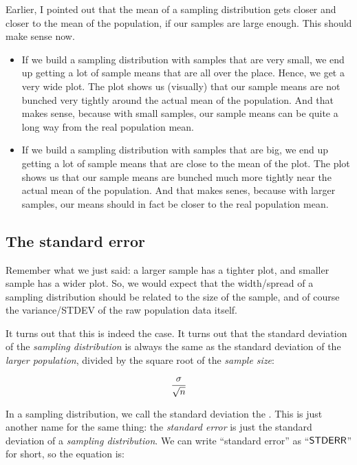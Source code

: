 \documentclass[../../../main.tex]{subfiles}
\begin{document}
\noindent
Earlier, I pointed out that the mean of a sampling distribution gets closer and closer to the mean of the population, if our samples are large enough. This should make sense now. 

\begin{itemize}

  \item If we build a sampling distribution with samples that are very small, we end up getting a lot of sample means that are all over the place. Hence, we get a very wide plot. The plot shows us (visually) that our sample means are not bunched very tightly around the actual mean of the population. And that makes sense, because with small samples, our sample means can be quite a long way from the real population mean.

  \item If we build a sampling distribution with samples that are big, we end up getting a lot of sample means that are close to the mean of the plot. The plot shows us that our sample means are bunched much more tightly near the actual mean of the population. And that makes senes, because with larger samples, our means should in fact be closer to the real population mean.

\end{itemize}


\subsection{The standard error}

Remember what we just said: a larger sample has a tighter plot, and smaller sample has a wider plot. So, we would expect that the width/spread of a sampling distribution should be related to the size of the sample, and of course the variance/STDEV of the raw population data itself.

It turns out that this is indeed the case. It turns out that the standard deviation of the \emph{sampling distribution} is always the same as the standard deviation of the \emph{larger population}, divided by the square root of the \emph{sample size}:

\begin{equation*}
  \frac{\populationstdev}{\sqrt{\samplesize/}}
\end{equation*}

\noindent
In a sampling distribution, we call the standard deviation the . This is just another name for the same thing: the \emph{standard error} is just the standard deviation of a \emph{sampling distribution}. We can write ``standard error'' as ``$\StdErr/$'' for short, so the equation is:
\end{document}
